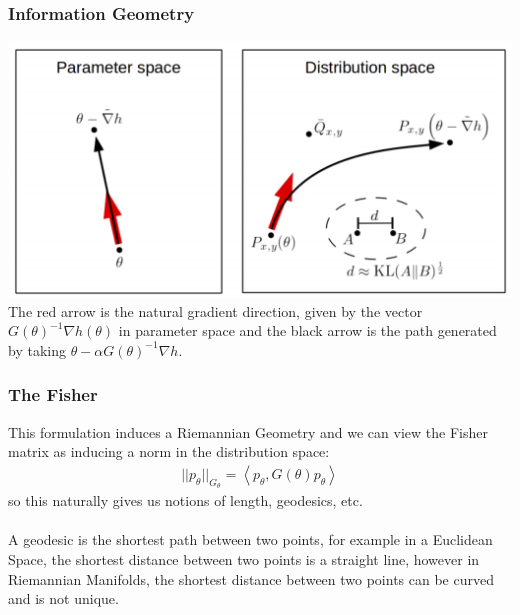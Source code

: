 \documentclass[hyperref={pdfpagelabels=false}]{beamer}
\begin{document}
\begin{frame}
\frametitle{Information Geometry}
\includegraphics[scale=0.3]{ng.png}
 The red arrow is the natural gradient direction, given by the vector $G(\theta)^{-1}\nabla h(\theta)$ in parameter space and the black arrow is the path generated by taking $\theta - \alpha G(\theta)^{-1}\nabla h$.
\end{frame}


\begin{frame}
\frametitle{The Fisher}
This formulation induces a Riemannian Geometry and we can view the Fisher matrix as inducing a norm in the distribution space:
\begin{align*}
|| p_{\theta}||_{G_{\theta}} = \left\langle p_{\theta}, G(\theta) p_{\theta} \right\rangle
\end{align*}
so this naturally gives us notions of length, geodesics, etc.\\
\
\\
 A geodesic is the shortest path between two points, for example in a Euclidean Space, the shortest distance between two points is a straight line, however in Riemannian Manifolds, the shortest distance between two points can be curved and is not unique.
\end{frame}
\end{document}
